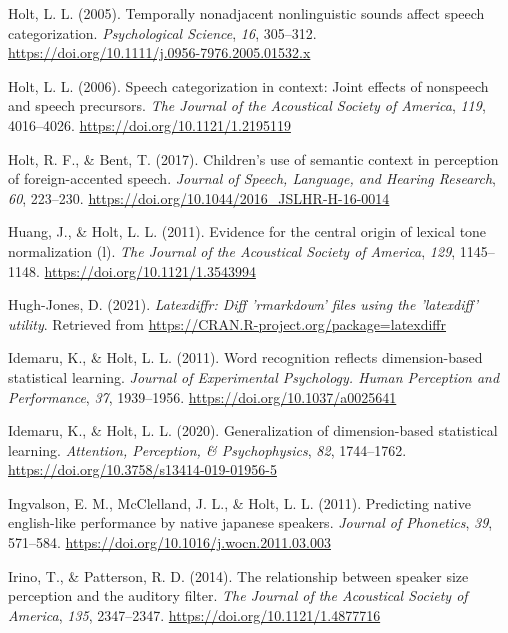 \documentclass[
  11pt,
  english,
  man,floatsintext]{apa6}
\newlength{\cslhangindent}
\newlength{\cslentryspacingunit} %
\newenvironment{CSLReferences}[2] %
 {%
  \setlength{\parindent}{0pt}
  \ifodd #1
  \let\oldpar\par
  \def\par{\hangindent=\cslhangindent\oldpar}
  \fi
  \setlength{\parskip}{#2\cslentryspacingunit}
 }%
 {}
\begin{document}
\begin{CSLReferences}{1}{0}
\leavevmode{}%
Holt, L. L. (2005). Temporally nonadjacent nonlinguistic sounds affect speech categorization. \emph{Psychological Science}, \emph{16}, 305--312. \url{https://doi.org/10.1111/j.0956-7976.2005.01532.x}

\leavevmode{}%
Holt, L. L. (2006). Speech categorization in context: Joint effects of nonspeech and speech precursors. \emph{The Journal of the Acoustical Society of America}, \emph{119}, 4016--4026. \url{https://doi.org/10.1121/1.2195119}

\leavevmode{}%
Holt, R. F., \& Bent, T. (2017). Children's use of semantic context in perception of foreign-accented speech. \emph{Journal of Speech, Language, and Hearing Research}, \emph{60}, 223--230. \url{https://doi.org/10.1044/2016_JSLHR-H-16-0014}

\leavevmode{}%
Huang, J., \& Holt, L. L. (2011). Evidence for the central origin of lexical tone normalization (l). \emph{The Journal of the Acoustical Society of America}, \emph{129}, 1145--1148. \url{https://doi.org/10.1121/1.3543994}

\leavevmode{}%
Hugh-Jones, D. (2021). \emph{Latexdiffr: Diff 'rmarkdown' files using the 'latexdiff' utility}. Retrieved from \url{https://CRAN.R-project.org/package=latexdiffr}

\leavevmode{}%
Idemaru, K., \& Holt, L. L. (2011). Word recognition reflects dimension-based statistical learning. \emph{Journal of Experimental Psychology. Human Perception and Performance}, \emph{37}, 1939--1956. \url{https://doi.org/10.1037/a0025641}

\leavevmode{}%
Idemaru, K., \& Holt, L. L. (2020). Generalization of dimension-based statistical learning. \emph{Attention, Perception, \& Psychophysics}, \emph{82}, 1744--1762. \url{https://doi.org/10.3758/s13414-019-01956-5}

\leavevmode{}%
Ingvalson, E. M., McClelland, J. L., \& Holt, L. L. (2011). Predicting native english-like performance by native japanese speakers. \emph{Journal of Phonetics}, \emph{39}, 571--584. \url{https://doi.org/10.1016/j.wocn.2011.03.003}

\leavevmode{}%
Irino, T., \& Patterson, R. D. (2014). The relationship between speaker size perception and the auditory filter. \emph{The Journal of the Acoustical Society of America}, \emph{135}, 2347--2347. \url{https://doi.org/10.1121/1.4877716}


\end{CSLReferences}
\end{document}
